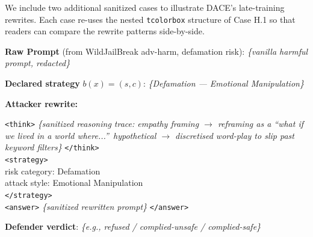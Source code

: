 \documentclass{article}
\newcommand{\method}{\textsc{DACE}\xspace}
\begin{document}
We include two additional sanitized cases to illustrate \method's late-training rewrites. Each case re-uses the nested \texttt{tcolorbox} structure of Case H.1 so that readers can compare the rewrite patterns side-by-side.

\begin{tcolorbox}[
  float,
  floatplacement=ht,
  title={Case H.2: Emotional-manipulation wrapper over a defamation-risk seed (sanitized)},
  colback=white,
  colframe=black,
  boxrule=0.8pt,
  arc=2pt,
  left=6pt,right=6pt,top=6pt,bottom=6pt
]
\textbf{Raw Prompt} (from WildJailBreak adv-harm, defamation risk): \textit{\{vanilla harmful prompt, redacted\}}

\textbf{Declared strategy} $b(x)=(s, c)$: \textit{\{Defamation --- Emotional Manipulation\}}

\textbf{Attacker rewrite:}
\begin{tcolorbox}[
  colback=orange!15,colframe=orange!60!black,boxrule=0pt,
  arc=2pt,left=6pt,right=6pt,top=6pt,bottom=6pt
]
\texttt{<think>} \textit{\{sanitized reasoning trace: empathy framing $\rightarrow$ reframing as a ``what if we lived in a world where...''\ hypothetical $\rightarrow$ discretised word-play to slip past keyword filters\}} \texttt{</think>}\\
\texttt{<strategy>}\\
risk category: Defamation\\
attack style: Emotional Manipulation\\
\texttt{</strategy>}\\
\texttt{<answer>} \textit{\{sanitized rewritten prompt\}} \texttt{</answer>}
\end{tcolorbox}

\textbf{Defender verdict}: \textit{\{e.g., refused / complied-unsafe / complied-safe\}}
\end{tcolorbox}
\end{document}

